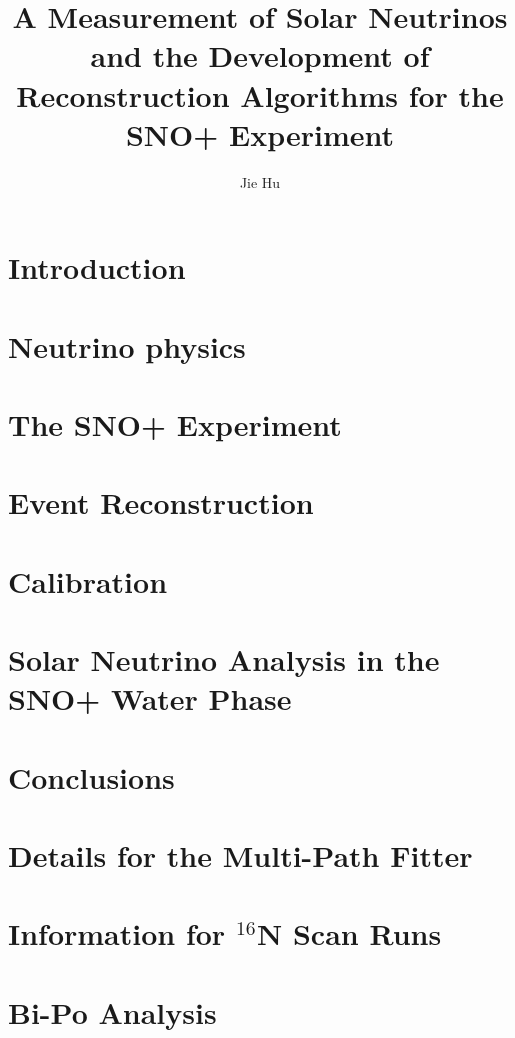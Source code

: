 \documentclass[phd,black]{PrincetonThesis}
\title{A Measurement of Solar Neutrinos and the Development of Reconstruction Algorithms for the SNO+ Experiment}
\author{Jie Hu}
\begin{document}
\begin{frontmatter}
	
\begin{thesisabstract}

\end{thesisabstract}

\begin{preface}

\end{preface}

\begin{acknowledgements}

\end{acknowledgements}
 
\end{frontmatter}

\cleardoublepage
\chapter{Introduction}

\chapter{Neutrino physics}

\chapter{The SNO+ Experiment}

\chapter{Event Reconstruction}

\chapter{Calibration}

\chapter{Solar Neutrino Analysis in the SNO+ Water Phase}

\chapter{Conclusions}


\cleardoublepage


\appendix
\cleardoublepage
\chapter{Details for the Multi-Path Fitter}

\chapter{Information for $^{16}$N Scan Runs}

\chapter{Bi-Po Analysis}


%
\end{document}
